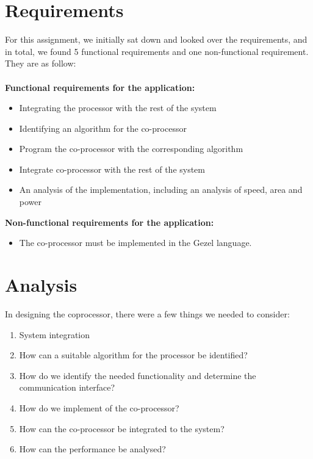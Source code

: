 \documentclass[12pt,a4paper]{article}
\begin{document}
\section{Requirements}
For this assignment, we initially sat down and looked over the requirements, and in total, we found 5 functional requirements and one non-functional requirement. They are as follow: \\
\\
\textbf{ Functional requirements for the application:}
\begin{itemize}
	\item Integrating the processor with the rest of the system
	\item Identifying an algorithm for the co-processor
	\item Program the co-processor with the corresponding algorithm
	\item Integrate co-processor with the rest of the system
	\item An analysis of the implementation, including an analysis of speed, area and power
\end{itemize}
\textbf{Non-functional requirements for the application:}
\begin {itemize}
	\item The co-processor must be implemented in the Gezel language.
\end{itemize}

\newpage

\section{Analysis}
In designing the coprocessor, there were a few things we needed to consider:
\begin{enumerate}
	\item System integration
	\item How can a suitable algorithm for the processor be identified?
	\item How do we identify the needed functionality and determine the communication interface?
	\item How do we implement of the co-processor?
	\item How can the co-processor be integrated to the system?
	\item How can the performance be analysed?
\end{enumerate}
\end{document}
